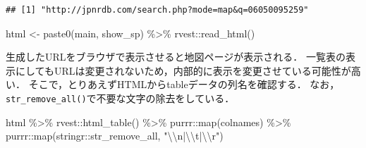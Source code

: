 \documentclass[
]{article}
\newenvironment{Shaded}{\begin{snugshade}}{\end{snugshade}}
\newcommand{\FunctionTok}[1]{\textcolor[rgb]{0.00,0.00,0.00}{#1}}
\newcommand{\NormalTok}[1]{#1}
\newcommand{\OtherTok}[1]{\textcolor[rgb]{0.56,0.35,0.01}{#1}}
\newcommand{\SpecialCharTok}[1]{\textcolor[rgb]{0.00,0.00,0.00}{#1}}
\newcommand{\StringTok}[1]{\textcolor[rgb]{0.31,0.60,0.02}{#1}}
\begin{document}
\begin{verbatim}
## [1] "http://jpnrdb.com/search.php?mode=map&q=06050095259"
\end{verbatim}

\begin{Shaded}
\begin{Highlighting}[]
\NormalTok{html }\OtherTok{\textless{}{-}} 
  \FunctionTok{paste0}\NormalTok{(main, show\_sp) }\SpecialCharTok{\%\textgreater{}\%}
\NormalTok{  rvest}\SpecialCharTok{::}\FunctionTok{read\_html}\NormalTok{()}
\end{Highlighting}
\end{Shaded}

生成したURLをブラウザで表示させると地図ページが表示される．
一覧表の表示にしてもURLは変更されないため，内部的に表示を変更させている可能性が高い．
そこで，とりあえずHTMLからtableデータの列名を確認する．
なお，\texttt{str\_remove\_all()}で不要な文字の除去をしている．

\begin{Shaded}
\begin{Highlighting}[]
\NormalTok{html }\SpecialCharTok{\%\textgreater{}\%}
\NormalTok{  rvest}\SpecialCharTok{::}\FunctionTok{html\_table}\NormalTok{() }\SpecialCharTok{\%\textgreater{}\%}
\NormalTok{  purrr}\SpecialCharTok{::}\FunctionTok{map}\NormalTok{(colnames) }\SpecialCharTok{\%\textgreater{}\%}
\NormalTok{  purrr}\SpecialCharTok{::}\FunctionTok{map}\NormalTok{(stringr}\SpecialCharTok{::}\NormalTok{str\_remove\_all, }\StringTok{"}\SpecialCharTok{\textbackslash{}\textbackslash{}}\StringTok{n|}\SpecialCharTok{\textbackslash{}\textbackslash{}}\StringTok{t|}\SpecialCharTok{\textbackslash{}\textbackslash{}}\StringTok{r"}\NormalTok{)}
\end{Highlighting}
\end{Shaded}
\end{document}
